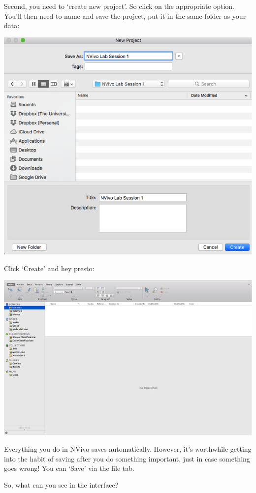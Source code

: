 \documentclass[]{book}
\theoremstyle{definition}
\theoremstyle{definition}
\theoremstyle{definition}
\theoremstyle{remark}
\begin{document}
Second, you need to `create new project'. So click on the appropriate
option. You'll then need to name and save the project, put it in the
same folder as your data:

\includegraphics{imgs/qual_06.png}

Click `Create' and hey presto:

\includegraphics{imgs/qual_07.png}

Everything you do in NVivo saves automatically. However, it's worthwhile
getting into the habit of saving after you do something important, just
in case something goes wrong! You can `Save' via the file tab.

So, what can you see in the interface?
\end{document}
